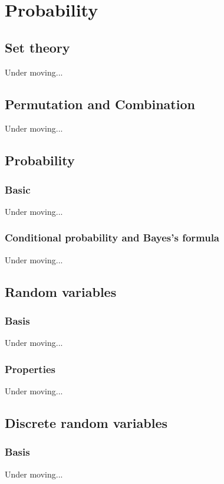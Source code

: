 \section{Probability}

\subsection{Set theory}
Under moving...



\subsection{Permutation and Combination}
Under moving...



\subsection{Probability}
\subsubsection{Basic}
Under moving...


\subsubsection{Conditional probability and Bayes’s formula}
Under moving...



\subsection{Random variables}
\subsubsection{Basis}
Under moving...


\subsubsection{Properties}
Under moving...



\subsection{Discrete random variables}
\subsubsection{Basis}
Under moving...


